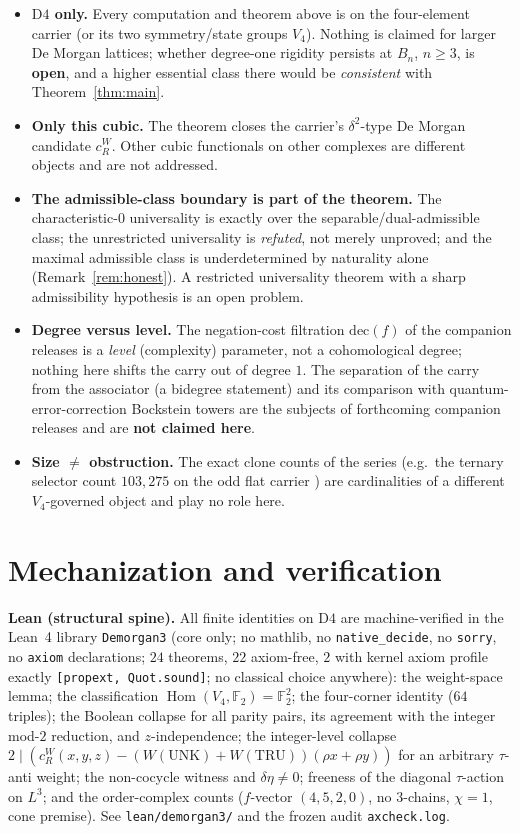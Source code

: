 \documentclass[11pt]{article}
\theoremstyle{definition}
\theoremstyle{remark}
\newcommand{\F}{\mathbb{F}}
\newcommand{\UNK}{\mathrm{UNK}}
\newcommand{\TRU}{\mathrm{TRU}}
\newcommand{\Dfour}{\mathrm{D4}}
\newcommand{\Hom}{\operatorname{Hom}}
\newcommand{\cR}{c_R^W}
\begin{document}
\begin{itemize}
\item \textbf{$\Dfour$ only.} Every computation and theorem above is on the four-element carrier (or its two symmetry/state groups $V_4$). Nothing is claimed for larger De Morgan lattices; whether degree-one rigidity persists at $B_n$, $n\ge3$, is \textbf{open}, and a higher essential class there would be \emph{consistent} with Theorem~\ref{thm:main}.
\item \textbf{Only this cubic.} The theorem closes the carrier's $\delta^2$-type De Morgan candidate $\cR$. Other cubic functionals on other complexes are different objects and are not addressed.
\item \textbf{The admissible-class boundary is part of the theorem.} The characteristic-$0$ universality is exactly over the separable/dual-admissible class; the unrestricted universality is \emph{refuted}, not merely unproved; and the maximal admissible class is underdetermined by naturality alone (Remark~\ref{rem:honest}). A restricted universality theorem with a sharp admissibility hypothesis is an open problem.
\item \textbf{Degree versus level.} The negation-cost filtration $\mathrm{dec}(f)$ of the companion releases \cite{wcy2,cohom} is a \emph{level} (complexity) parameter, not a cohomological degree; nothing here shifts the carry out of degree $1$. The separation of the carry from the associator (a bidegree statement) and its comparison with quantum-error-correction Bockstein towers are the subjects of forthcoming companion releases and are \textbf{not claimed here}.
\item \textbf{Size $\ne$ obstruction.} The exact clone counts of the series (e.g.\ the ternary selector count $103{,}275$ on the odd flat carrier \cite{p3}) are cardinalities of a different $V_4$-governed object and play no role here.
\end{itemize}

\section{Mechanization and verification}\label{sec:mech}

\textbf{Lean (structural spine).} All finite identities on $\Dfour$ are machine-verified in the Lean~4 library \texttt{Demorgan3} (core only; no mathlib, no \texttt{native\_decide}, no \texttt{sorry}, no \texttt{axiom} declarations; $24$ theorems, $22$ axiom-free, $2$ with kernel axiom profile exactly \texttt{[propext, Quot.sound]}; no classical choice anywhere): the weight-space lemma; the classification $\Hom(V_4,\F_2)=\F_2^2$; the four-corner identity ($64$ triples); the Boolean collapse for all parity pairs, its agreement with the integer mod-$2$ reduction, and $z$-independence; the integer-level collapse $2\mid(\cR(x,y,z)-(W(\UNK){+}W(\TRU))(\rho x{+}\rho y))$ for an arbitrary $\tau$-anti weight; the non-cocycle witness and $\delta\eta\ne0$; freeness of the diagonal $\tau$-action on $L^3$; and the order-complex counts ($f$-vector $(4,5,2,0)$, no $3$-chains, $\chi=1$, cone premise). See \texttt{lean/demorgan3/} and the frozen audit \texttt{axcheck.log}.
\end{document}

